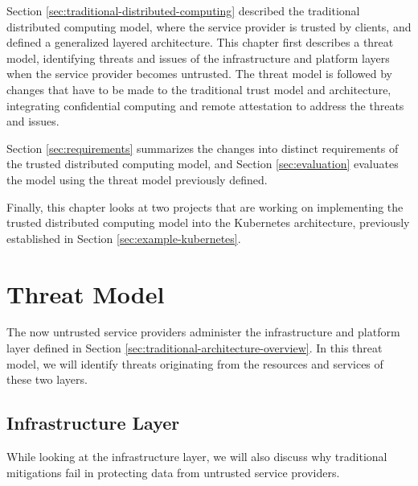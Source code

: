Section \ref{sec:traditional-distributed-computing} described the traditional
distributed computing model, where the service provider is trusted by clients,
and defined a generalized layered architecture. This chapter first describes a
threat model, identifying threats and issues of the infrastructure and platform
layers when the service provider becomes untrusted. The threat model is followed
by changes that have to be made to the traditional trust model and architecture,
integrating confidential computing and remote attestation to address the
threats and issues.

Section \ref{sec:requirements} summarizes the changes into distinct requirements
of the trusted distributed computing model, and Section \ref{sec:evaluation}
evaluates the model using the threat model previously defined.

Finally, this chapter looks at two projects that are working on implementing the
trusted distributed computing model into the Kubernetes architecture, previously
established in Section \ref{sec:example-kubernetes}.

\section{Threat Model}
\label{sec:untrusted-threat-model}

The now untrusted service providers administer the infrastructure and platform
layer defined in Section \ref{sec:traditional-architecture-overview}. In this
threat model, we will identify threats originating from the resources and
services of these two layers.

\subsection{Infrastructure Layer}

While looking at the infrastructure layer, we will also discuss why traditional
mitigations fail in protecting data from untrusted service providers.

